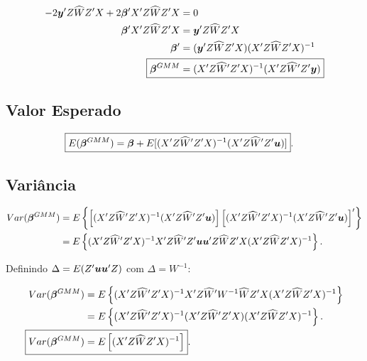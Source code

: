 \documentclass[11pt,oneside,a4paper]{article}
\numberwithin{equation}{section}
\begin{document}
\vspace{-1 em}
\begin{align*}
-2 \mbs{y}' Z \widehat{W} Z' X + 2 \mbs{\beta}'X' Z \widehat{W} Z' X &= 0
\\
\mbs{\beta}'X' Z \widehat{W} Z' X &= \mbs{y}' Z \widehat{W} Z' X 
\\
\mbs{\beta}' &= ( \mbs{y}' Z \widehat{W} Z' X ) ( X' Z \widehat{W} Z' X )^{-1}
\\
\Aboxed{
\mbs{\beta}^{GMM} &= ( X' Z \widehat{W}' Z' X )^{-1} ( X' Z \widehat{W}' Z' \mbs{y} ) }
\end{align*}

\subsection*{Valor Esperado} 

\vspace{-1 em}
\begin{align*}
\Aboxed{
E( \mbs{\beta}^{GMM} ) &=
\mbs{\beta} +
E[ ( X' Z \widehat{W}' Z' X )^{-1} ( X' Z \widehat{W}' Z' \mbs{u} ) ] }.
\end{align*}

\subsection*{Variância} 

\vspace{-1 em}
\begin{align*}
Var( \boldsymbol{\beta}^{GMM} ) &=
E \left\{ 
\left[ ( X' Z \widehat{W}' Z' X )^{-1} ( X' Z \widehat{W}' Z' \boldsymbol{u} ) \right]
\left[ ( X' Z \widehat{W}' Z' X )^{-1} ( X' Z \widehat{W}' Z' \boldsymbol{u} ) \right]'
\right\}
\\ &=
E \left\{ 
( X' Z \widehat{W}' Z' X )^{-1}
X' Z \widehat{W}' Z' \boldsymbol{u} \boldsymbol{u}' Z \widehat{W} Z' X 
( X' Z \widehat{W} Z' X )^{-1}
\right\}.
\end{align*}

\noindent
Definindo $\Delta = E(Z' \boldsymbol{u}\boldsymbol{u}' Z)$ com $\Delta = W^{-1}$:

\vspace{-1 em}
\begin{align*}
Var( \mbs{\beta}^{GMM} ) &=
E \left\{ 
( X' Z \widehat{W}' Z' X )^{-1}
X' Z \widehat{W}' W^{-1} \widehat{W} Z' X 
( X' Z \widehat{W} Z' X )^{-1}
\right\}
\\ &=
E \left\{ 
( X' Z \widehat{W}' Z' X )^{-1}
( X' Z \widehat{W}' Z' X )
( X' Z \widehat{W} Z' X )^{-1}
\right\}.
\\
\Aboxed{
Var( \mbs{\beta}^{GMM} ) &=
E \left[
( X' Z \widehat{W} Z' X )^{-1}
\right] }.
\end{align*}
\end{document}

